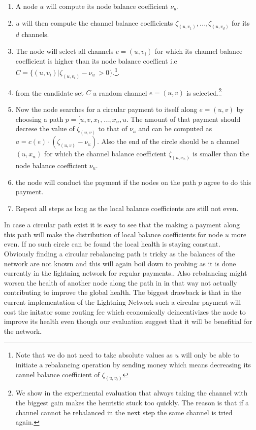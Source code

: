 \documentclass[a4paper]{paper}
\begin{document}
\begin{enumerate}
\item A node $u$ will compute its node balance coefficient $\nu_u$.
\item $u$ will then compute the channel balance coefficients $\zeta_{(u,v_1)},\dots,\zeta_{(u,v_d)}$ for its $d$ channels.
\item The node will select all channels $e=(u,v_i)$ for which its channel balance coefficient is higher than its node balance coeffient i.e $C = \{(u,v_i) | \zeta_{(u,v_i)} - \nu_u\ > 0\}$.\footnote{Note that we do not need to take absolute values as $u$ will only be able to initiate a rebalancing operation by sending money which means decreasing its cannel balance coefficient of $\zeta_{(u,v_i)}$}.
\item from the candidate set $C$ a random channel $e=(u,v)$ is selected.\footnote{We show in the experimental evaluation that always taking the channel with the biggest gain makes the heuristic stuck too quickly. The reason is that if a channel cannot be rebalanced in the next step the same channel is tried again.} 
\item Now the node searches for a circular payment to itself along $e=(u,v)$ by choosing a path $p = [u,v,x_1,\dots,x_n,u$. The amount of that payment should decrese the value of $\zeta_{(u,v)}$ to that of $\nu_u$ and can be computed as $a = c(e)\cdot (\zeta_{(u,v)}-\nu_u)$. Also the end of the circle should be a channel $(u,x_n)$ for which the channel balance coefficient $\zeta_{(u,x_n)}$ is smaller than the node balance coefficient $\nu_u$.
\item the node will conduct the payment if the nodes on the path $p$ agree to do this payment. 
 \item Repeat all steps as long as the local balance coefficients are still not even.
\end{enumerate}

In case a circular path exist it is easy to see that the making a payment along this path will make the distribution of local balance coefficients for node $u$ more even.
If no such circle can be found the local health is staying constant.
Obviously finding a circular rebalancing path is tricky as the balances of the network are not known and this will again boil down to probing as it is done currently in the lightning network for regular payments..
Also rebalancing might worsen the health of another node along the path in in that way not actually contributing to improve the global health.
The biggest drawback is that in the current implementation of the Lightning Network such a circular payment will cost the initator some routing fee which economically deincentivizes the node to improve its health even though our evaluation suggest that it will be benefitial for the network.
\end{document}
